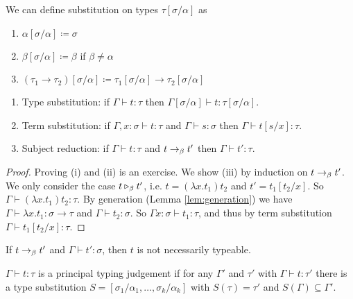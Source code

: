 \begin{boxdefi}
    We can define \alert{substitution} on types \alert{$\tau[\sigma/\alpha]$} as
    \begin{enumerate}
        \item $\alpha [\sigma / \alpha] \coloneq \sigma$
        \item $\beta [\sigma / \alpha] \coloneq \beta$ if $\beta \ne \alpha$
        \item $(\tau_1 \to \tau_2)[\sigma / \alpha] \coloneq \tau_1[\sigma / \alpha] \to \tau_2 [\sigma / \alpha]$
    \end{enumerate}
\end{boxdefi}

\begin{boxprop}
    \hfill
    \begin{enumerate}
        \item Type substitution: if $\Gamma \vdash t : \tau$ then $\Gamma [\sigma / \alpha] \vdash t : \tau [\sigma / \alpha]$.
        \item Term substitution: if $\Gamma, x : \sigma \vdash t : \tau$ and $\Gamma \vdash s : \sigma$ then $\Gamma \vdash t [s/x] : \tau$.
        \item Subject reduction: if $\Gamma \vdash t : \tau$ and $t \to_{\beta} t'$ then $\Gamma \vdash t' : \tau$.
    \end{enumerate}
\end{boxprop}
\begin{proof}
    Proving (i) and (ii) is an exercise.
    We show (iii) by induction on $t \to_{\beta} t'$.
    We only consider the case $t \triangleright_{\beta} t'$, i.e. $t = (\lambda x. t_1)t_2$ and $t ' = t_1[t_2/x]$.
    So $\Gamma \vdash (\lambda x. t_1) t_2 : \tau$.
    By generation (Lemma \ref{lem:generation}) we have $\Gamma \vdash \lambda x. t_1 : \sigma \to \tau$ and $\Gamma \vdash t_2 : \sigma$.
    So $\Gamma x : \sigma \vdash t_1 : \tau$, and thus by term substitution $\Gamma \vdash t_1[t_2/x] : \tau$.
\end{proof}

\begin{rem}
    If $t \to_{\beta} t'$ and $\Gamma \vdash t' : \sigma$, then $t$ is not necessarily typeable.
\end{rem}

\begin{boxdefi}
    $\Gamma \vdash t : \tau$ is a \alert{principal typing judgement} if for any $\Gamma'$ and $\tau'$ with $\Gamma \vdash t : \tau'$ there is a type substitution $S = [\sigma_1 / \alpha_1, \dots, \sigma_k / \alpha_k]$ with $S(\tau) = \tau'$ and $S(\Gamma) \subseteq \Gamma'$.
\end{boxdefi}


